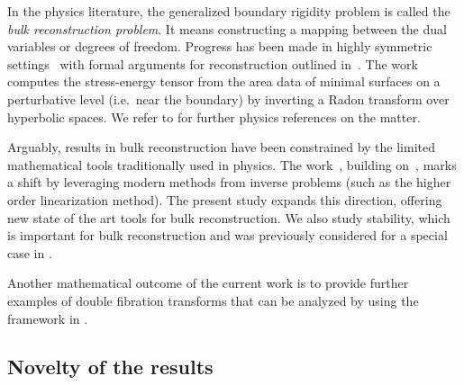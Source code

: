 \documentclass[11pt]{amsart}
\theoremstyle{definition}
\numberwithin{equation}{section}
\begin{document}
In the physics literature, the generalized boundary rigidity problem is called the \emph{bulk reconstruction problem}. It means constructing a mapping between the dual variables or degrees of freedom. Progress has been made in highly symmetric settings~\cite{bilson2008extracting,bilson2011extracting,fonda2015shape,jokela2021towards,jokela2019notes, Ji2025} with formal arguments for reconstruction outlined in~\cite{bao2019towards}. The work \cite{lin2015locality} computes the stress-energy tensor from the area data of minimal surfaces on a perturbative level (i.e.\ near the boundary) by inverting a Radon transform over hyperbolic spaces. We refer to \cite{jokela2025bulk, carstea2024calder} for further physics references on the matter.

Arguably, results in bulk reconstruction have been constrained by the limited mathematical tools traditionally used in physics. %
The work~\cite{jokela2025bulk}, building on~\cite{carstea2024calder}, marks a shift by leveraging modern methods from inverse problems (such as the higher order linearization method). The present study expands this direction, offering new state of the art tools for bulk reconstruction. 
We also study stability, which is important for bulk reconstruction and was previously considered for a special case in \cite{jokela2021towards}. 



Another mathematical outcome of the current work is to provide further examples of double fibration transforms that can be analyzed by using the framework in \cite{MST}.

\subsection{Novelty of the results}
\end{document}

